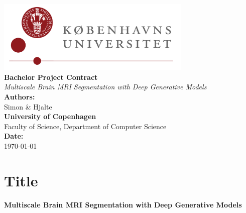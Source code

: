 \documentclass[12pt]{report}
\newcommand{\universitylogo}{\includegraphics[width=0.7\textwidth]{ku_logo_dk_hh.png}}
\begin{document}
\begin{titlepage}
  \begin{center}
      \universitylogo \\[1.5cm] %
      {\Huge \textbf{Bachelor Project Contract}} \\[0.8cm]
      {\Large \textit{Multiscale Brain MRI Segmentation with Deep Generative Models}} \\[2cm]
      {\Large \textbf{Authors:}} \\
      Simon \& Hjalte \\[1.5cm]
      {\Large \textbf{University of Copenhagen}} \\[0.5cm]
      {\Large Faculty of Science, Department of Computer Science} \\[1.5cm]
      {\Large \textbf{Date:}} \\
      \today
  \end{center}
  \vfill
\end{titlepage}

\pagestyle{fancy} %

\section*{Title}
\textbf{Multiscale Brain MRI Segmentation with Deep Generative Models}
\end{document}
